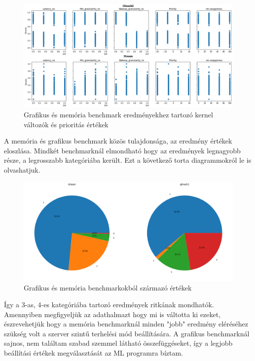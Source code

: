 \begin{figure}[h!]
\centering
\includegraphics[scale=0.35]{images/graphicsAndMemoryBenchmarkValue.png}
\caption{Grafikus és memória benchmark eredményekhez tartozó kernel változók és prioritás értékek}
\label{fig:GraphicsAndMemoryParameters}
\end{figure}

A memória és grafikus benchmark közös tulajdonsága, az eredmény értékek eloszlása. Mindkét benchmarknál elmondható hogy az eredmények legnagyobb része, a legrosszabb kategóriába került.
Ezt a következő torta diagrammokról le is olvashatjuk.

\begin{figure}[h!]
\centering
\includegraphics[scale=0.3]{images/graphicsAndMemoryBenchmarkChart.png}
\caption{Grafikus és memória benchmarkokból származó értékek}
\label{fig:GraphicsAndMemoryChart}
\end{figure}

Így a 3-as, 4-es kategóriába tartozó eredmények ritkának mondhatók. Amennyiben megfigyeljük az adathalmazt hogy mi is váltotta ki ezeket, észrevehetjük hogy a memória benchmarknál  minden "jobb" eredmény eléréséhez szükség volt a szerver szintű terhelési mód beállítására.
A grafikus benchmarknál sajnos, nem találtam szabad szemmel látható összefüggéseket, így a legjobb beállítási értékek megválasztását az ML programra bíztam.

